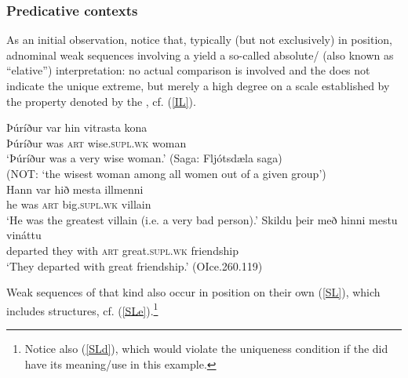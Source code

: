 \documentclass[output=paper,colorlinks,citecolor=brown]{langscibook}
\begin{document}
\subsubsection{Predicative  contexts}
\label{sec:9:PRD}

As an initial observation, notice that, typically (but not exclusively) in  position,  adnominal weak sequences involving a   yield a so-called absolute/  (also known as ``elative'') interpretation: no actual comparison is involved and the  does not indicate the unique extreme, but merely a high degree on a scale established by the property denoted by the , cf. (\ref{IL}).
 
\begin{exe}
\ex \label{IL}   
    \begin{xlist}
       \ex \label{ILa} \gll  Þúríður var hin vitrasta kona  \\
       Þúríður was \textsc{art} wise.\textsc{supl.wk} woman  \\ 
       \glt `Þúríður was a very wise  woman.' (Saga: Fljótsdæla saga) \\ 
       \glt (NOT: `the wisest woman  among all women out of a given group')  \\ 
      \ex \label{ILb} \gll  Hann  var hið mesta illmenni \\ 
       he  was \textsc{art} big.\textsc{supl.wk} villain \\ 
       \glt `He was the greatest villain (i.e.  a very bad person).'
      \ex \label{ILc} \gll  Skildu þeir með  hinni mestu vináttu  \\
       departed they with \textsc{art} great.\textsc{supl.wk} friendship \\ 
       \glt `They departed with great friendship.'  (OIce.260.119) %
\end{xlist} 
\end{exe}  


Weak sequences of that kind also occur in  position on their own (\ref{SL}), which includes  structures, cf. (\ref{SLe}).\footnote{Notice also (\ref{SLd}), which would violate the uniqueness condition if the  did have its  meaning/use in this example.  } 
\end{document}
